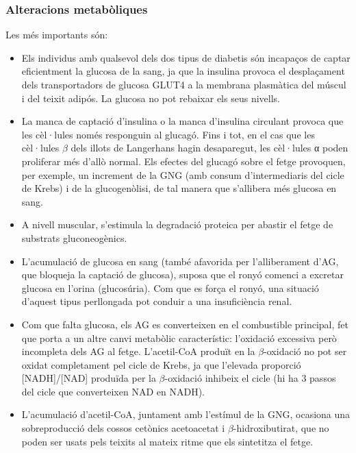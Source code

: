 \subsubsection{Alteracions metabòliques}
\label{sec:alter-metab}
Les més importants són:
\begin{itemize}
\item Els individus amb qualsevol dels dos tipus de diabetis són
  incapaços de captar eficientment la glucosa de la sang, ja que la
  insulina provoca el desplaçament dels transportadors de glucosa
  GLUT4 a la membrana plasmàtica del múscul i del teixit adipós. La
  glucosa no pot rebaixar els seus nivells.

\item La manca de captació d’insulina o la manca d’insulina circulant
provoca que les cèl·lules només responguin al glucagó. Fins i tot, en
el cas que les cèl·lules $\beta$ dels illots de Langerhans hagin
desaparegut, les cèl·lules α poden proliferar més d’allò normal. Els
efectes del glucagó sobre el fetge provoquen, per exemple, un
increment de la GNG (amb consum d’intermediaris del cicle de Krebs) i
de la glucogenòlisi, de tal manera que s’allibera més glucosa en
sang.  

\item A nivell muscular, s’estimula la degradació proteica per abastir
  el fetge de substrats gluconeogènics.

\item L’acumulació de glucosa en sang (també afavorida per
  l’alliberament d’AG, que bloqueja la captació de glucosa), suposa
  que el ronyó comenci a excretar glucosa en l’orina (glucosúria). Com
  que es força el ronyó, una situació d’aquest tipus perllongada pot
  conduir a una insuficiència renal.

\item Com que falta glucosa, els AG es converteixen en el combustible
  principal, fet que porta a un altre canvi metabòlic característic:
  l’oxidació excessiva però incompleta dels AG al fetge. L’acetil-CoA
  produït en la $\beta$-oxidació no pot ser oxidat completament pel cicle de
  Krebs, ja que l’elevada proporció [NADH]/[NAD] produïda per la
  $\beta$-oxidació inhibeix el cicle (hi ha 3 passos del cicle que
  converteixen NAD en NADH).

\item L’acumulació d’acetil-CoA, juntament amb l’estímul de la GNG,
  ocasiona una sobreproducció dels cossos cetònics acetoacetat i
  $\beta$-hidroxibutirat, que no poden ser usats pels teixits al
  mateix ritme que els sintetitza el fetge. 


\end{itemize}
